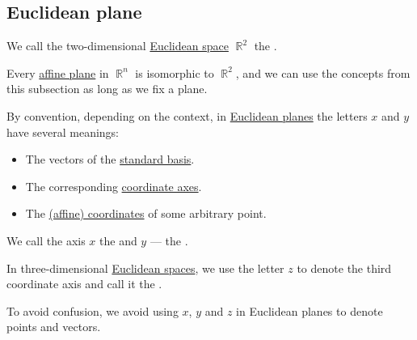 \subsection{Euclidean plane}\label{subsec:euclidean_plane}

\begin{definition}\label{def:euclidean_plane}
  We call the two-dimensional \hyperref[def:euclidean_space]{Euclidean space} \( \BbbR^2 \) the .
\end{definition}

\begin{remark}\label{rem:euclidean_plane_embedding}
  Every \hyperref[def:affine_plane]{affine plane} in \( \BbbR^n \) is isomorphic to \( \BbbR^2 \), and we can use the concepts from this subsection as long as we fix a plane.
\end{remark}

\begin{remark}\label{rem:xyz}
  By convention, depending on the context, in \hyperref[def:euclidean_plane]{Euclidean planes} the letters \( x \) and \( y \) have several meanings:
  \begin{itemize}
    \item The vectors of the \hyperref[def:sequence_space]{standard basis}.
    \item The corresponding \hyperref[def:euclidean_plane]{coordinate axes}.
    \item The \hyperref[def:affine_coordinate_system]{(affine) coordinates} of some arbitrary point.
  \end{itemize}

  We call the axis \( x \) the  and \( y \) --- the .

  In three-dimensional \hyperref[def:euclidean_space]{Euclidean spaces}, we use the letter \( z \) to denote the third coordinate axis and call it the .

  To avoid confusion, we avoid using \( x \), \( y \) and \( z \) in Euclidean planes to denote points and vectors.
\end{remark}


